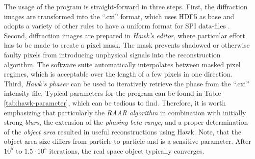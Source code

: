 The usage of the program is straight-forward in three steps. First, the diffraction images are transformed into the ``.cxi'' format, which uses HDF5 as base and adopts a variety of other rules to have a uniform format for SPI data-files \citep{Maia-2012-NatMet}. Second, diffraction images are prepared in \textit{Hawk's editor}, where particular effort has to be made to create a pixel mask. The mask prevents shadowed or otherwise faulty pixels from introducing unphysical signals into the reconstruction algorithm. The software suite automatically interpolates between masked pixel regimes, which is acceptable over the length of a few pixels in one direction. Third, \textit{Hawk's phaser} can be used to iteratively retrieve the phase from the ``.cxi'' intensity file. Typical parameters for the program can be found in Table \ref{tab:hawk-parameter}, which can be tedious to find. Therefore, it is worth emphasizing that particularly the \textit{RAAR algorithm} \cite{Luke-2005-IP} in combination with initially strong \textit{blurs}, the extension of the \textit{phasing beta range}, and a proper determination of the \textit{object area} resulted in useful reconstructions using Hawk. Note, that the object area size differs from particle to particle and is a sensitive parameter. After $10^{5}$ to $1.5\cdot 10^{5}$ iterations, the real space object typically converges.
%
%
%
